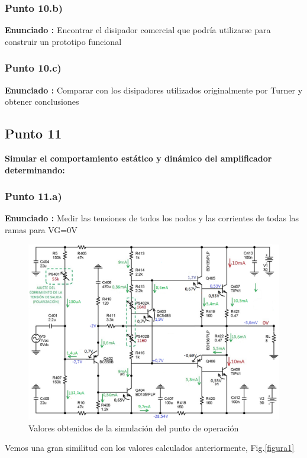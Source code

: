 \documentclass[12pt]{book}
\begin{document}
\subsubsection{Punto 10.b)}
\textbf{Enunciado : } Encontrar el disipador comercial que podría utilizarse para construir un prototipo funcional\\[1cm]

\subsubsection{Punto 10.c)}
\textbf{Enunciado : } Comparar con los disipadores utilizados originalmente por Turner y obtener conclusiones\\[1cm]

\subsection{Punto 11}
\textbf{Simular el comportamiento estático y dinámico del amplificador determinando:}\\

\subsubsection{Punto 11.a)}
\textbf{Enunciado : } Medir las tensiones de todos los nodos y las corrientes de todas las ramas para VG=0V\\[1cm]
\begin{figure}[H]
\centering
\includegraphics[scale=0.4]{figuras/11-a-valoresReposo.png}
\caption{Valores obtenidos de la simulación del punto de operación}
\label{figura11a}
\end{figure}
Vemos una gran similitud con los valores calculados anteriormente, Fig.\eqref{figura1}
\end{document}
